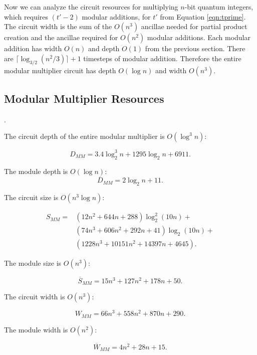\documentclass[twoside]{article}
\begin{document}
Now we can analyze the circuit resources for multiplying $n$-bit
quantum integers, which requires $(t'-2)$ modular additions, for $t'$ from
Equation \ref{eqn:tprime}.
The circuit width is the sum of the $O(n^3)$ ancillae
needed for partial product creation and the ancillae required for $O(n^2)$
modular additions. Each modular addition has width $O(n)$ and depth $O(1)$
from the previous
section. There are
$\lceil \log_{3/2}(n^2 / 3) \rceil +1 $ timesteps of modular addition. Therefore
the entire modular multiplier circuit has depth $O(\log n)$ and width $O(n^3)$.

\subsection{Modular Multiplier Resources}
\label{subsec:mod-mult-resources}.

The circuit depth of the entire modular multiplier is $O(\log^3 n)$:

\begin{equation}
D_{MM} = 3.4 \log_2^3 n + 1295 \log_2 n + 6911\text{.}
\end{equation}

The module depth is $O(\log n)$:
\begin{equation}
\overline{D}_{MM} = 2\log_2 n + 11\text{.}
\end{equation}

The circuit size is $O(n^3\log n)$:

\begin{eqnarray}
S_{MM} = & (12n^2 + 644n + 288)\log_2^2 (10n) +\\
        & (74n^3 + 606n^2 + 292n + 41)\log_2 (10n) +\\
        & (1228n^3 + 10151n^2 + 14397n + 4645)\text{.}
\end{eqnarray}

The module size is $O(n^3)$:

\begin{equation}
\overline{S}_{MM} = 15n^3 + 127n^2 + 178n + 50{.}
\end{equation}

The circuit width is $O(n^3)$:

\begin{equation}
W_{MM} = 66n^3 + 558n^2 + 870n + 290\text{.}
\end{equation}

The module width is $O(n^2)$:

\begin{equation}
\overline{W}_{MM} = 4n^2 + 28n + 15\text{.}
\end{equation}
\end{document}
